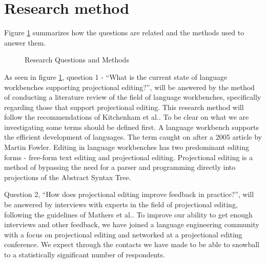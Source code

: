 \section{Research method}

Figure \ref{fig:Research_Questions} summarizes how the questions are related and the methods used to answer them.
\begin{figure}[H]
    \centering
    \caption{Research Questions and Methods}
    \label{fig:Research_Questions}
\end{figure}

As seen in figure \ref{fig:Research_Questions}, question 1 - ``What is the current state of language workbenches supporting projectional editing?'', will be answered by the method of conducting a literature review of the field of language workbenches, specifically regarding those that support projectional editing. 
This research method will follow the recommendations of Kitchenham et al.\cite{kitchenham2015evidence}.
To be clear on what we are investigating some terms should be defined first.
A language workbench supports the efficient development of languages. 
The term caught on after a 2005 article by Martin Fowler\cite{Fowler_lwb}. 
Editing in language workbenches has two predominant editing forms - free-form text editing and projectional editing\cite{erdweg2013state}.
Projectional editing is a method of bypassing the need for a parser and programming directly into projections of the Abstract Syntax Tree.

Question 2, ``How does projectional editing improve feedback in practice?'', will be answered by interviews with experts in the field of projectional editing, following the guidelines of Mathers et al.\cite{mathers1998using}.
To improve our ability to get enough interviews and other feedback, we have joined a language engineering community with a focus on projectional editing and networked at a projectional editing conference.
We expect through the contacts we have made to be able to snowball to a statistically significant number of respondents.

